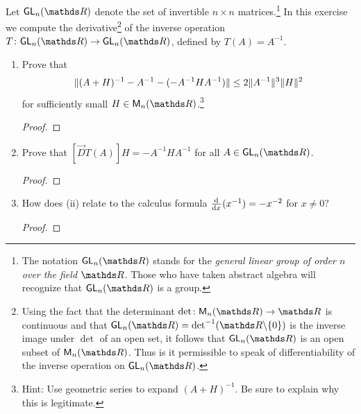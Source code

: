 \documentclass{../homework}
\begin{document}
\begin{Exercise}
	Let \(\mathsf{GL}_n(\R)\) denote the set of invertible \(n \times n\)
  matrices.\footnote{The notation \(\mathsf{GL}_n(\R)\) stands for the
    \emph{general linear group of order \(n\) over the field \(\R\)}.
    Those who have taken abstract algebra will recognize that
    \(\mathsf{GL}_n(\R)\) is a group.}  In this exercise we compute the
  derivative\footnote{Using the fact that the determinant
    \(\det \colon \M_n(\R) \to \R\) is continuous and that
    \(\mathsf{GL}_n(\R) = \det^{-1}( \R \backslash \{0\} )\) is the
    inverse image under \(\det\) of an open set, it follows that
    \(\mathsf{GL}_n(\R)\) is an open subset of \(\M_n(\R)\).  Thus is it
    permissible to speak of differentiability of the inverse operation
    on \(\mathsf{GL}_n(\R)\). } of the inverse operation
  \(T \colon \mathsf{GL}_n(\R) \to \mathsf{GL}_n(\R)\), defined by
  \(T(A) = A^{-1}\).
	\begin{enumerate}
  \item Prove that
    \begin{equation*}
      \lVert {
        (A+H)^{-1} - A^{-1} - (-A^{-1} HA^{-1})
      } \rVert
      \leq 2 \lVert {A^{-1}} \rVert^3 \lVert {H} \rVert^2
    \end{equation*}
    for sufficiently small \(H \in \M_n(\R)\).\footnote{Hint: Use
      geometric series to expand \((A+H)^{-1}\).  Be sure to explain why
      this is legitimate.}

    \begin{solution}
      \begin{proof}

      \end{proof}
    \end{solution}

  \item Prove that \([\vec{D}T(A)]H = -A^{-1}HA^{-1}\) for all
    \(A \in \mathsf{GL}_n(\R)\).

    \begin{solution}
      \begin{proof}

      \end{proof}
    \end{solution}

  \item How does (ii) relate to the calculus formula
    \(\frac{\mathop{}\! \mathrm d^{} {}}{\mathop{}\! \mathrm d {x}^{}} (x^{-1}) = -x^{-2}\) for \(x \neq 0\)?

    \begin{solution}
      \begin{proof}

      \end{proof}
    \end{solution}
	\end{enumerate}
\end{Exercise}
\end{document}
